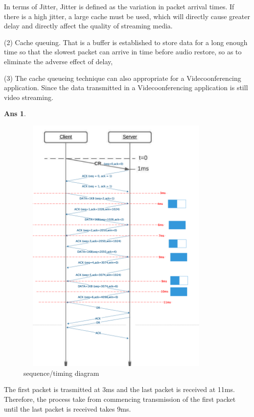 \documentclass[11pt]{article} %
\newtheorem{Q}{Ans}
\begin{document}
In terms of Jitter, Jitter is defined as the variation in packet arrival times. If there is a high jitter, a large cache must be used, which will directly cause greater delay and directly affect the quality of streaming media.

 (2)
Cache queuing. That is a buffer is established to store data for a long enough time so that the slowest packet can arrive in time before audio restore, so as to eliminate the adverse effect of delay,  
 
 (3)
 The cache queueing technique can also appropriate for a Videcoonferencing application. Since the data transmitted in a Videcoonferencing application is still video streaming. 
\begin{Q}
\end{Q}
 \begin{figure}[htbp]
 \centering
\includegraphics[height=13cm,width=10cm]{img/diagram.png}
\caption{sequence/timing diagram }
 \end{figure}

The first packet is trasmitted at 3ms and the last packet is received at 11ms. Therefore, the process take from commencing transmission of the first packet until 
the last packet is received takes 9ms.
\end{document}

